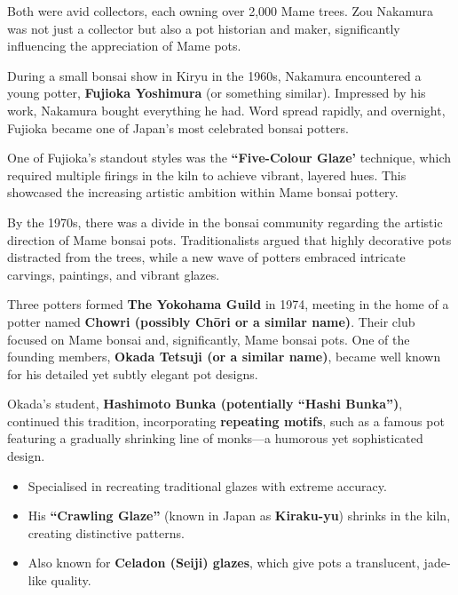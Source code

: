 Both were avid collectors, each owning over 2,000 Mame trees.
Zou Nakamura was not just a collector but also a pot historian and maker, significantly influencing the appreciation of Mame pots.

During a small bonsai show in Kiryu in the 1960s, Nakamura encountered a young potter, \textbf{Fujioka Yoshimura} (or something similar).
Impressed by his work, Nakamura bought everything he had.
Word spread rapidly, and overnight, Fujioka became one of Japan's most celebrated bonsai potters.

\medskip

\noindent
One of Fujioka's standout styles was the \textbf{``Five\--Colour Glaze'} technique, which required multiple firings in the kiln to achieve vibrant, layered hues.
This showcased the increasing artistic ambition within Mame bonsai pottery.

\medskip

\noindent
By the 1970s, there was a divide in the bonsai community regarding the artistic direction of Mame bonsai pots.
Traditionalists argued that highly decorative pots distracted from the trees, while a new wave of potters embraced intricate carvings, paintings, and vibrant glazes.

Three potters formed \textbf{The Yokohama Guild} in 1974, meeting in the home of a potter named \textbf{Chowri (possibly Chōri or a similar name)}.
Their club focused on Mame bonsai and, significantly, Mame bonsai pots.
One of the founding members, \textbf{Okada Tetsuji (or a similar name)}, became well known for his detailed yet subtly elegant pot designs.

Okada's student, \textbf{Hashimoto Bunka (potentially ``Hashi Bunka'')}, continued this tradition, incorporating \textbf{repeating motifs}, such as a famous pot featuring a gradually shrinking line of monks—a humorous yet sophisticated design.

\medskip
\columnbreak

{}
\noindent
\begin{itemize}
    \item Specialised in recreating traditional glazes with extreme accuracy.

    \item His \textbf{``Crawling Glaze''} (known in Japan as \textbf{Kiraku\--yu}) shrinks in the kiln, creating distinctive patterns.
    
    \item Also known for \textbf{Celadon (Seiji) glazes}, which give pots a translucent, jade\--like quality.
\end{itemize}

